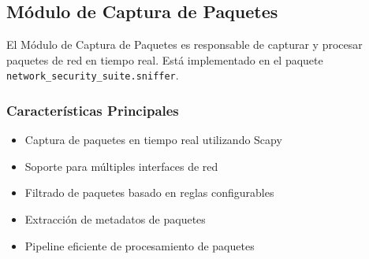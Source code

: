 \subsection{Módulo de Captura de Paquetes}
El Módulo de Captura de Paquetes es responsable de capturar y procesar paquetes de red en tiempo real. Está implementado en el paquete \texttt{network\_security\_suite.sniffer}.

\subsubsection{Características Principales}
\begin{itemize}
    \item Captura de paquetes en tiempo real utilizando Scapy
    \item Soporte para múltiples interfaces de red
    \item Filtrado de paquetes basado en reglas configurables
    \item Extracción de metadatos de paquetes
    \item Pipeline eficiente de procesamiento de paquetes
\end{itemize}

